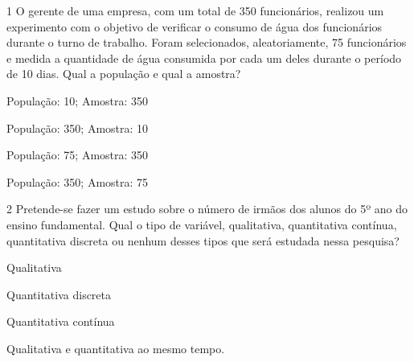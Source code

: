 
\num{1} O gerente de uma empresa, com um total de 350 funcionários,
realizou um experimento com o objetivo de verificar o consumo de água
dos funcionários durante o turno de trabalho. Foram selecionados,
aleatoriamente, 75 funcionários e medida a quantidade de água consumida
por cada um deles durante o período de 10 dias. Qual a população e qual
a amostra?

\begin{minipage}{.5\textwidth}
\begin{escolha}
\item
  População: 10; Amostra: 350
\item
  População: 350; Amostra: 10
\item
  População: 75; Amostra: 350
\item
  População: 350; Amostra: 75
\end{escolha}
\end{minipage}

\num{2} Pretende-se fazer um estudo sobre o número de irmãos dos alunos do
5º ano do ensino fundamental. Qual o tipo de variável, qualitativa,
quantitativa contínua, quantitativa discreta ou nenhum desses tipos que
será estudada nessa pesquisa?

\begin{minipage}{.5\textwidth}
\begin{escolha}
\item
  Qualitativa
\item
  Quantitativa discreta
\item
  Quantitativa contínua
\item
  Qualitativa e quantitativa ao mesmo tempo.
\end{escolha}
\end{minipage}

